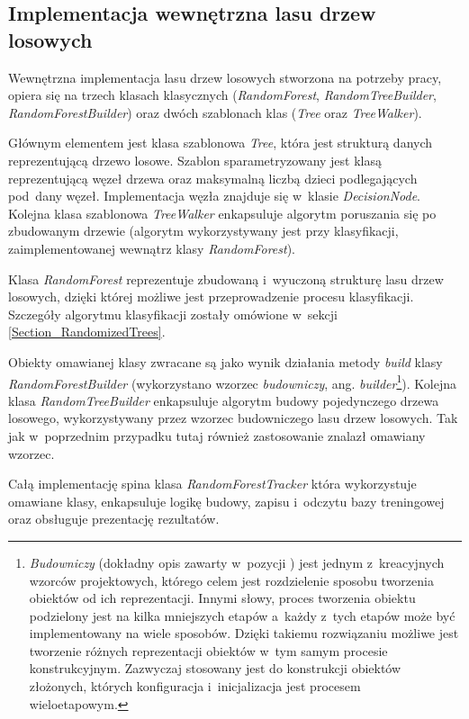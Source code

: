    \subsection{Implementacja wewnętrzna lasu drzew losowych}

      Wewnętrzna implementacja lasu drzew losowych stworzona na potrzeby pracy, opiera się na trzech klasach klasycznych (\textit{RandomForest}, \textit{RandomTreeBuilder}, \textit{RandomForestBuilder}) oraz dwóch szablonach klas (\textit{Tree} oraz \textit{TreeWalker}).

      Głównym elementem jest klasa szablonowa \textit{Tree}, która jest strukturą danych reprezentującą drzewo losowe. Szablon sparametryzowany jest klasą reprezentującą węzeł drzewa oraz maksymalną liczbą dzieci podlegających pod~dany węzeł. Implementacja węzła znajduje się w~klasie \textit{DecisionNode}. Kolejna klasa szablonowa \textit{TreeWalker} enkapsuluje algorytm poruszania się po zbudowanym drzewie (algorytm wykorzystywany jest przy klasyfikacji, zaimplementowanej wewnątrz klasy \textit{RandomForest}).

      Klasa \textit{RandomForest} reprezentuje zbudowaną i~wyuczoną strukturę lasu drzew losowych, dzięki której możliwe jest przeprowadzenie procesu klasyfikacji. Szczegóły algorytmu klasyfikacji zostały omówione w~sekcji \ref{Section_RandomizedTrees}.

      Obiekty omawianej klasy zwracane są jako wynik działania metody \textit{build} klasy \textit{RandomForestBuilder} (wykorzystano wzorzec \textit{budowniczy}, ang. \textit{builder}\footnote{\textit{Budowniczy} (dokładny opis zawarty w~pozycji \cite{PatternsGoF}) jest jednym z~kreacyjnych wzorców projektowych, którego celem jest rozdzielenie sposobu tworzenia obiektów od ich reprezentacji. Innymi słowy, proces tworzenia obiektu podzielony jest na kilka mniejszych etapów a~każdy z~tych etapów może być implementowany na wiele sposobów. Dzięki takiemu rozwiązaniu możliwe jest tworzenie różnych reprezentacji obiektów w~tym samym procesie konstrukcyjnym. Zazwyczaj stosowany jest do konstrukcji obiektów złożonych, których konfiguracja i~inicjalizacja jest procesem wieloetapowym.}). Kolejna klasa \textit{RandomTreeBuilder} enkapsuluje algorytm budowy pojedynczego drzewa losowego, wykorzystywany przez wzorzec budowniczego lasu drzew losowych. Tak jak w~poprzednim przypadku tutaj również zastosowanie znalazł omawiany wzorzec.

      Całą implementację spina klasa \textit{RandomForestTracker} która wykorzystuje omawiane klasy, enkapsuluje logikę budowy, zapisu i~odczytu bazy treningowej oraz obsługuje prezentację rezultatów.


